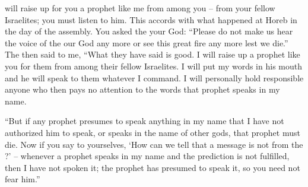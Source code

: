 {will raise
up for you a prophet
like
me from among you – from your fellow Israelites; you must listen to him.
This accords
with
what happened at Horeb
in the day
of the assembly.
You asked
the {}
your God: “Please do not
make
us hear
the
voice
of the {}
our God
any more or
see
this
great
fire
any more
lest we die.”
The
{}
then said
to me,
“What they have
said
is good.
I will raise
up a prophet
like you for them
from among
their fellow
Israelites. I will put
my words
in his mouth
and he will speak
to them
whatever
I command.
I
will personally
hold responsible anyone
who then pays no
attention
to
the words
that
prophet speaks
in my name.
\par }{\PP {}“But
if any prophet
presumes
to speak
anything
in my name
that
I have not
authorized him
to speak,
or speaks
in the name
of other
gods,
that prophet
must die.
Now if
you say
to yourselves, ‘How
can we tell that
a message
is not
from the
{}?’ –
whenever
a prophet
speaks
in my
name
and the prediction
is not
fulfilled,
then I
have not
spoken
it; the prophet
has presumed
to speak
it, so you need not
fear him.”

}
